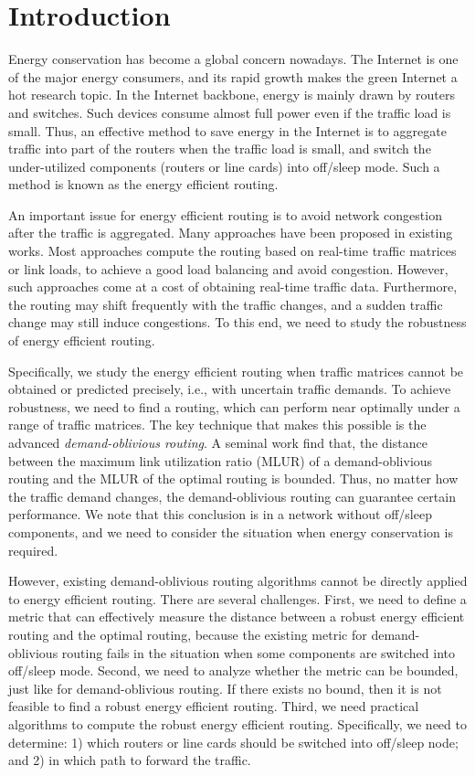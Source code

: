 \documentclass[conference]{IEEEtran}
\begin{document}
\IEEEpeerreviewmaketitle

\section{Introduction}

Energy conservation has become a global concern nowadays. The Internet is one of the major energy consumers, and its rapid growth makes the green Internet a hot research topic. In the Internet backbone, energy is mainly drawn by routers and switches. Such devices consume almost full power even if the traffic load is small. Thus, an effective method to save energy in the Internet is to aggregate traffic into part of the routers when the traffic load is small, and switch the under-utilized components (routers or line cards) into off/sleep mode. Such a method is known as the energy efficient routing.

An important issue for energy efficient routing is to avoid network congestion after the traffic is aggregated. Many approaches have been proposed in existing works. Most approaches compute the routing based on real-time traffic matrices or link loads, to achieve a good load balancing and avoid congestion. However, such approaches come at a cost of obtaining real-time traffic data. Furthermore, the routing may shift frequently with the traffic changes, and a sudden traffic change may still induce congestions. To this end, we need to study the robustness of energy efficient routing.

Specifically, we study the energy efficient routing when traffic matrices cannot be obtained or predicted precisely, i.e., with uncertain traffic demands. To achieve robustness, we need to find a routing, which can perform near optimally under a range of traffic matrices. The key technique that makes this possible is the advanced \emph{demand-oblivious routing}. A seminal work \cite{networking:oblivious} find that, the distance between the maximum link utilization ratio (MLUR) of a demand-oblivious routing and the MLUR of the optimal routing is bounded. Thus, no matter how the traffic demand changes, the demand-oblivious routing can guarantee certain performance. We note that this conclusion is in a network without off/sleep components, and we need to consider the situation when energy conservation is required.

However, existing demand-oblivious routing algorithms cannot be directly applied to energy efficient routing. There are several challenges. First, we need to define a metric that can effectively measure the distance between a robust energy efficient routing and the optimal routing, because the existing metric for demand-oblivious routing fails in the situation when some components are switched into off/sleep mode. Second, we need to analyze whether the metric can be bounded, just like for demand-oblivious routing. If there exists no bound, then it is not feasible to find a robust energy efficient routing. Third, we need practical algorithms to compute the robust energy efficient routing. Specifically, we need to determine: 1) which routers or line cards should be switched into off/sleep node; and 2) in which path to forward the traffic.
\end{document}

